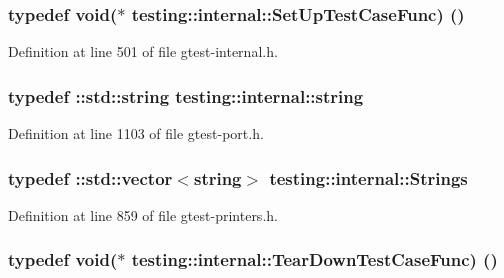 \subsubsection[{\texorpdfstring{Set\+Up\+Test\+Case\+Func}{SetUpTestCaseFunc}}]{\setlength{\rightskip}{0pt plus 5cm}typedef void($\ast$ testing\+::internal\+::\+Set\+Up\+Test\+Case\+Func) ()}\hypertarget{namespacetesting_1_1internal_a30037044c0b57cdd647c7e2e97cb2cff}{}\label{namespacetesting_1_1internal_a30037044c0b57cdd647c7e2e97cb2cff}


Definition at line 501 of file gtest-\/internal.\+h.

\subsubsection[{\texorpdfstring{string}{string}}]{\setlength{\rightskip}{0pt plus 5cm}typedef \+::std\+::string {\bf testing\+::internal\+::string}}\hypertarget{namespacetesting_1_1internal_a8e8ff5b11e64078831112677156cb111}{}\label{namespacetesting_1_1internal_a8e8ff5b11e64078831112677156cb111}


Definition at line 1103 of file gtest-\/port.\+h.

\subsubsection[{\texorpdfstring{Strings}{Strings}}]{\setlength{\rightskip}{0pt plus 5cm}typedef \+::std\+::vector$<${\bf string}$>$ {\bf testing\+::internal\+::\+Strings}}\hypertarget{namespacetesting_1_1internal_a7706b17f05f4b49e351b052ae4e05073}{}\label{namespacetesting_1_1internal_a7706b17f05f4b49e351b052ae4e05073}


Definition at line 859 of file gtest-\/printers.\+h.

\subsubsection[{\texorpdfstring{Tear\+Down\+Test\+Case\+Func}{TearDownTestCaseFunc}}]{\setlength{\rightskip}{0pt plus 5cm}typedef void($\ast$ testing\+::internal\+::\+Tear\+Down\+Test\+Case\+Func) ()}\hypertarget{namespacetesting_1_1internal_a085e31321d0d029c04d2a79234f60c1a}{}\label{namespacetesting_1_1internal_a085e31321d0d029c04d2a79234f60c1a}


